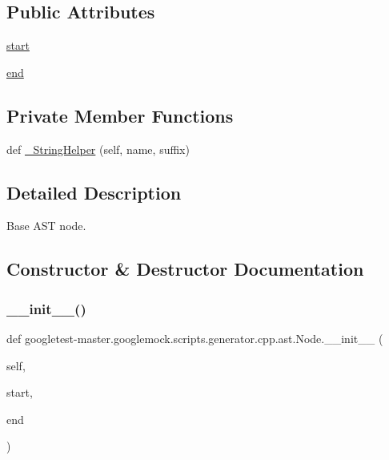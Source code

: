 \subsection*{Public Attributes}
\begin{DoxyCompactItemize}
\item 
\mbox{\hyperlink{classgoogletest-master_1_1googlemock_1_1scripts_1_1generator_1_1cpp_1_1ast_1_1_node_a6f9eb279a989f9ca27e7d0f1975336d1}{start}}
\item 
\mbox{\hyperlink{classgoogletest-master_1_1googlemock_1_1scripts_1_1generator_1_1cpp_1_1ast_1_1_node_a747e90ade89c1764e83b5b649bde18cc}{end}}
\end{DoxyCompactItemize}
\subsection*{Private Member Functions}
\begin{DoxyCompactItemize}
\item 
def \mbox{\hyperlink{classgoogletest-master_1_1googlemock_1_1scripts_1_1generator_1_1cpp_1_1ast_1_1_node_a0e9159bc974e5a8d0b47eb6015f75529}{\+\_\+\+String\+Helper}} (self, name, suffix)
\end{DoxyCompactItemize}


\subsection{Detailed Description}
\begin{DoxyVerb}Base AST node.\end{DoxyVerb}
 

\subsection{Constructor \& Destructor Documentation}
\mbox{\label{classgoogletest-master_1_1googlemock_1_1scripts_1_1generator_1_1cpp_1_1ast_1_1_node_a2d5197ecd5b39f31c38b61a54b481eb8}} 
\subsubsection{\texorpdfstring{\_\_init\_\_()}{\_\_init\_\_()}}
{\footnotesize\ttfamily def googletest-\/master.\+googlemock.\+scripts.\+generator.\+cpp.\+ast.\+Node.\+\_\+\+\_\+init\+\_\+\+\_\+ (\begin{DoxyParamCaption}\item[{}]{self,  }\item[{}]{start,  }\item[{}]{end }\end{DoxyParamCaption})}



